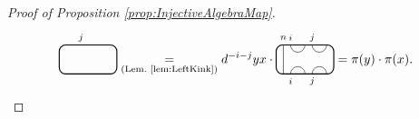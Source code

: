 \documentclass[11pt]{article}
\theoremstyle{plain}
\theoremstyle{definition}
\newcommand{\TLTCalcLabelOffset}[3][0cm]{
 \settowidth{#2}{\scriptsize{$#3$}}
 \setlength{#2}{.5#2}
 \setlength{#2}{\maxof{#2}{#1}}
}
\newcommand{\TLTEnd}{
 \draw[thick, rounded corners = 5pt] (0,0) rectangle ($ (TLTlead) + (0,.8) $);
 \end{tikzpicture}
}
\newcommand{\TLTStart}{
 \begin{tikzpicture}[baseline=.3cm]
 \coordinate (TLTlead) at (.2,0); %
 \let\TLTlabelwidth\relax
 \newlength{\TLTlabelwidth}
}
\newcommand{\TLTThrough}[1]{
 \TLTCalcLabelOffset[.2cm]{\TLTlabelwidth}{#1}
 \coordinate (TLTlead) at ($ (TLTlead) + ({\TLTlabelwidth},0) $);
 \begin{scope}[shift=(TLTlead)]
  \draw (0,0) -- (0,.8);
  \node at (0,1) {\scriptsize{$#1$}};
 \end{scope}
  \coordinate (TLTlead) at ($ (TLTlead) + ({\TLTlabelwidth},0) $);
}
\newcommand{\TLTCapcup}[1]{
 \TLTCalcLabelOffset[.2cm]{\TLTlabelwidth}{#1}
  \coordinate (TLTlead) at ($ (TLTlead) + ({\TLTlabelwidth},0) $);
 \begin{scope}[shift=(TLTlead)]
  \draw (0,0) arc (180:0:.2);
  \draw (0,.8) arc (-180:0:.2);
  \node at (0,1) {\scriptsize{$#1$}};
 \end{scope}
 \TLTCalcLabelOffset[.5cm]{\TLTlabelwidth}{#1}
 \coordinate (TLTlead) at ($ (TLTlead) + ({\TLTlabelwidth},0)$);
}
\begin{document}
\begin{proof}[Proof of Proposition \ref{prop:InjectiveAlgebraMap}]
$$\begin{tikzpicture}[baseline=.3cm]
  \node at (.6,1) {\scriptsize{$j$}};
  \draw[thick, rounded corners = 5pt] (0,0) rectangle (1.6,.8);
 \end{tikzpicture}
\underset{\text{(Lem.~\ref{lem:LeftKink})}}{=} 
d^{-i-j} yx \cdot 
 \begin{tikzpicture}[baseline=.3cm]
  \draw (.2,0) -- (.2,.8);
  \node at (.2,1) {\scriptsize{$n$}};
  \draw (.4,0) arc (180:0:.2cm);
  \node at (.4,-.2) {\scriptsize{$i$}};
  \draw (.4,.8) arc (-180:0:.2cm);
  \node at (.4,1) {\scriptsize{$i$}};
  \draw (1,0) arc (180:0:.2cm);
  \node at (1,-.2) {\scriptsize{$j$}};
  \draw (1,.8) arc (-180:0:.2cm);
  \node at (1,1) {\scriptsize{$j$}};
  \draw[thick, rounded corners = 5pt] (0,0) rectangle (1.6,.8);
 \end{tikzpicture}
 = \pi(y) \cdot \pi(x).
$$


\end{proof}
\end{document}
